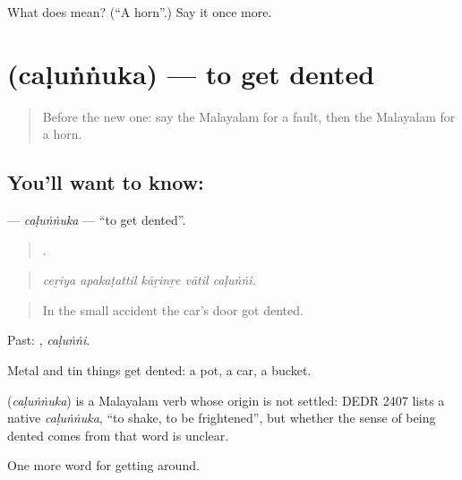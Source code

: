 \begin{tcolorbox}[breakable,colback=teal!4,colframe=teal!35!black,title={Before you move on}]
What does  mean? (\textquotedblleft{}A horn\textquotedblright{}.) Say it once more.
\end{tcolorbox}
\section[\texorpdfstring{\ml{ചളുങ്ങുക} (caḷuṅṅuka)}{ചളുങ്ങുക (caḷuṅṅuka)}]{ (caḷuṅṅuka) — to get dented}

\label{lesson:ML-C471-calunnuka}



\begin{quote}
Before the new one: say the Malayalam for a fault, then the Malayalam for a horn.
\end{quote}

\subsection*{You'll want to know: }
\textbf{} — \emph{caḷuṅṅuka} — \textquotedblleft{}to get dented\textquotedblright{}.

\begin{quote}
    .
\end{quote}

\begin{quote}
\emph{ceṟiya apakaṭattil kāṟinṟe vātil caḷuṅṅi.}
\end{quote}

\begin{quote}
In the small accident the car's door got dented.
\end{quote}

Past: , \emph{caḷuṅṅi}.

Metal and tin things get dented: a pot, a car, a bucket.

\begin{cousinweb}
\textbf{} (\emph{caḷuṅṅuka}) is a Malayalam verb whose origin is not settled: DEDR 2407 lists a native \emph{caḷuṅṅuka}, \textquotedblleft{}to shake, to be frightened\textquotedblright{}, but whether the sense of being dented comes from that word is unclear.
\end{cousinweb}

\begin{grammarlens}[title={What you've built}]
One more word for getting around.
\end{grammarlens}

